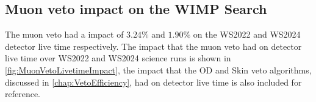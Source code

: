 \subsection{Muon veto impact on the WIMP Search}
The muon veto had a impact of $3.24\%$ and $1.90\%$ on the WS2022 and WS2024 detector live time respectively. The impact that the muon veto had on detector live time over WS2022 and WS2024 science runs is shown in \autoref{fig:MuonVetoLivetimeImpact}, the impact that the OD and Skin veto algorithms, discussed in \autoref{chap:VetoEfficiency}, had on detector live time is also included for reference.

